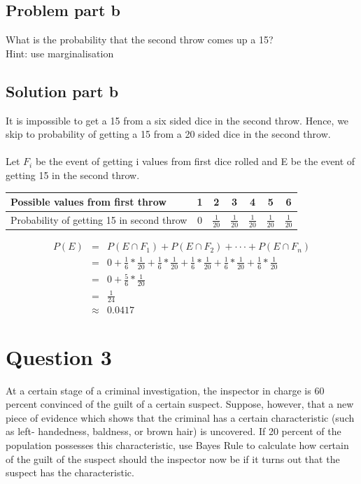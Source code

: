 \documentclass[12pt]{article}%
\begin{document}
\subsection*{Problem part b}
What is the probability that the second throw comes up a 15? \\ Hint: use marginalisation
\subsection*{Solution part b}
It is impossible to get a 15 from a six sided dice in the second throw. Hence, we skip to probability of getting a 15 from a 20 sided dice in the second throw. \\ \\
Let $F_i$ be the event of getting i values from first dice rolled and E be the event of getting 15 in the second throw.
\begin{center}
\begin{tabular}{|| p{4cm} | c | c | c | c | c | c ||}
\hline
Possible values from first throw & 1 & 2 & 3 & 4 & 5 & 6 \\
\hline\hline 
Probability of getting 15 in second throw & 0 & $\frac{1}{20}$ & $\frac{1}{20}$ & $\frac{1}{20}$ & $\frac{1}{20}$ & $\frac{1}{20}$ \\
\hline
\end{tabular}
\end{center}
\begin{eqnarray*}
P(E) & = & P(E \cap F_1 ) + P(E \cap F_2 ) + \cdot \cdot \cdot + P(E \cap F_n ) \\
	 & = & 0 + \frac{1}{6} * \frac{1}{20} + \frac{1}{6} * \frac{1}{20} + \frac{1}{6} * \frac{1}{20} + \frac{1}{6} * \frac{1}{20} + \frac{1}{6} * \frac{1}{20} \\
	 & = & 0 + \frac{5}{6} * \frac{1}{20} \\
	 & = & \frac{1}{24} \\
	 & \approx & 0.0417
\end{eqnarray*}

\newpage
\section*{Question 3}
At a certain stage of a criminal investigation, the inspector in charge is 60 percent convinced of the guilt of a certain suspect. Suppose, however, that a new piece of evidence which shows that the criminal has a certain characteristic (such as left- handedness, baldness, or brown hair) is uncovered. If 20 percent of the population possesses this characteristic, use Bayes Rule to calculate how certain of the guilt of the suspect should the inspector now be if it turns out that the suspect has the characteristic. \\
\end{document}

